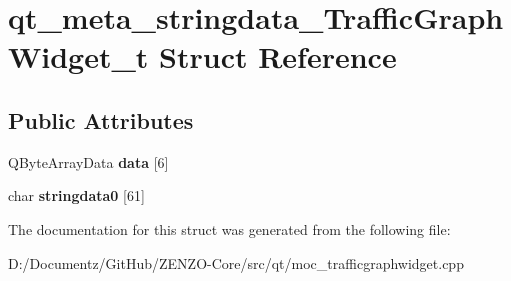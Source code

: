 \hypertarget{structqt__meta__stringdata___traffic_graph_widget__t}{}\section{qt\+\_\+meta\+\_\+stringdata\+\_\+\+Traffic\+Graph\+Widget\+\_\+t Struct Reference}
\label{structqt__meta__stringdata___traffic_graph_widget__t}
\subsection*{Public Attributes}
\begin{DoxyCompactItemize}
\item 
\mbox{\label{structqt__meta__stringdata___traffic_graph_widget__t_a29f33ea4ed19d9679e9a88a964d264c0}} 
Q\+Byte\+Array\+Data {\bfseries data} \mbox{[}6\mbox{]}
\item 
\mbox{\label{structqt__meta__stringdata___traffic_graph_widget__t_a65f45005ac771f685c8378bb3df3a192}} 
char {\bfseries stringdata0} \mbox{[}61\mbox{]}
\end{DoxyCompactItemize}


The documentation for this struct was generated from the following file\+:\begin{DoxyCompactItemize}
\item 
D\+:/\+Documentz/\+Git\+Hub/\+Z\+E\+N\+Z\+O-\/\+Core/src/qt/moc\+\_\+trafficgraphwidget.\+cpp\end{DoxyCompactItemize}
